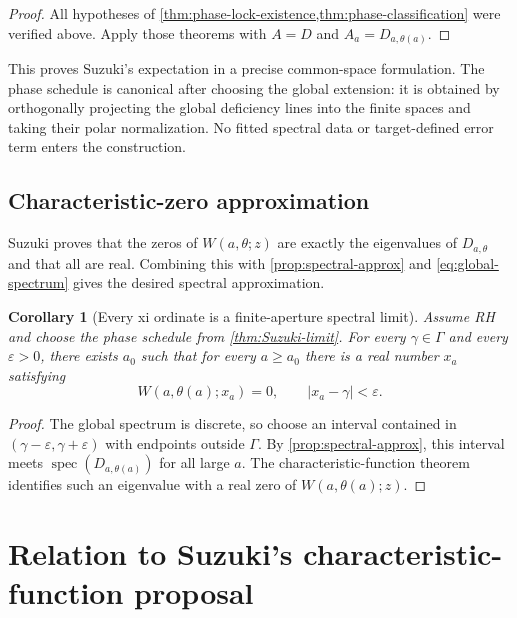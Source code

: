 \documentclass[11pt]{article}
\newtheorem{corollary}[theorem]{Corollary}
\theoremstyle{remark}
\newcommand{\spec}{\operatorname{spec}}
\begin{document}
\begin{proof}
All hypotheses of \cref{thm:phase-lock-existence,thm:phase-classification} were verified above.
Apply those theorems with $A=D$ and $A_a=D_{a,\theta(a)}$.
\end{proof}

This proves Suzuki's expectation in a precise common-space formulation.  The phase schedule is
canonical after choosing the global extension: it is obtained by orthogonally projecting the global
deficiency lines into the finite spaces and taking their polar normalization.  No fitted spectral
data or target-defined error term enters the construction.

\subsection{Characteristic-zero approximation}\leavevmode\par

Suzuki proves that the zeros of $W(a,\theta;z)$ are exactly the eigenvalues of $D_{a,\theta}$ and
that all are real.  Combining this with \cref{prop:spectral-approx} and
\eqref{eq:global-spectrum} gives the desired spectral approximation.

\begin{corollary}[Every xi ordinate is a finite-aperture spectral limit]\label{cor:Xi-approx}
Assume RH and choose the phase schedule from \cref{thm:Suzuki-limit}.  For every
$\gamma\in\Gamma$ and every $\varepsilon>0$, there exists $a_0$ such that for every $a\geq a_0$
there is a real number $x_a$ satisfying
\begin{equation}\label{eq:characteristic-zero-approx}
 W(a,\theta(a);x_a)=0,
 \qquad
 |x_a-\gamma|<\varepsilon.
\end{equation}
\end{corollary}

\begin{proof}
The global spectrum is discrete, so choose an interval contained in
$(\gamma-\varepsilon,\gamma+\varepsilon)$ with endpoints outside $\Gamma$.  By
\cref{prop:spectral-approx}, this interval meets $\spec(D_{a,\theta(a)})$ for all large $a$.
The characteristic-function theorem identifies such an eigenvalue with a real zero of
$W(a,\theta(a);z)$.
\end{proof}

\section{Relation to Suzuki's characteristic-function proposal}
\end{document}
